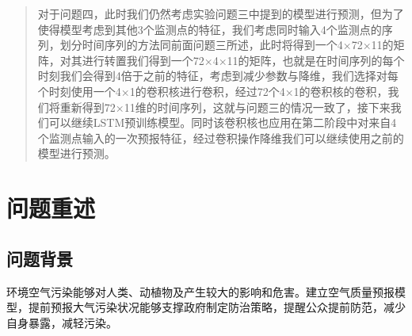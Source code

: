 \documentclass[bwprint]{gmcmthesis}
\numberwithin{figure}{section}
\begin{document}
\begin{abstract}
对于问题四，此时我们仍然考虑实验问题三中提到的模型进行预测，但为了使得模型考虑到其他3个监测点的特征，我们考虑同时输入4个监测点的序列，划分时间序列的方法同前面问题三所述，此时将得到一个4×72×11的矩阵，对其进行转置我们得到一个72×4×11的矩阵，也就是在时间序列的每个时刻我们会得到4倍于之前的特征，考虑到减少参数与降维，我们选择对每个时刻使用一个4×1的卷积核进行卷积，经过72个4×1的卷积核的卷积，我们将重新得到72×11维的时间序列，这就与问题三的情况一致了，接下来我们可以继续LSTM预训练模型。同时该卷积核也应用在第二阶段中对来自4个监测点输入的一次预报特征，经过卷积操作降维我们可以继续使用之前的模型进行预测。





\end{abstract}


\tableofcontents
\newpage

\section{问题重述}
\subsection{问题背景}
环境空气污染能够对人类、动植物及产生较大的影响和危害。建立空气质量预报模型，提前预报大气污染状况能够支撑政府制定防治策略，提醒公众提前防范，减少自身暴露，减轻污染。
\end{document}
